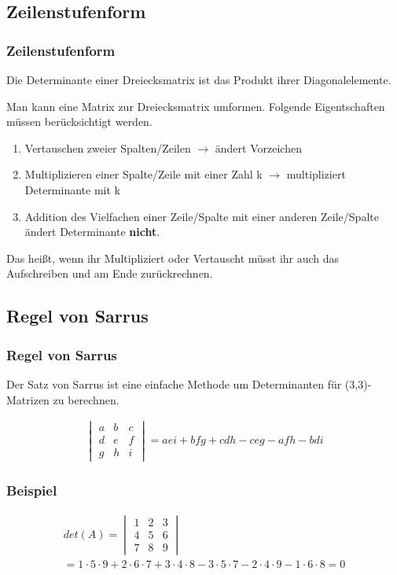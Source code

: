 \subsection{Zeilenstufenform}
\begin{frame}
	\frametitle{Zeilenstufenform}
	Die Determinante einer Dreiecksmatrix ist das Produkt ihrer Diagonalelemente.

	Man kann eine Matrix zur Dreiecksmatrix umformen. 
	Folgende Eigentschaften müssen berücksichtigt werden.
	\begin{enumerate}
	\item Vertauschen zweier Spalten/Zeilen $\rightarrow$ ändert Vorzeichen
	\item Multiplizieren einer Spalte/Zeile mit einer Zahl k $\rightarrow$ multipliziert Determinante mit k
	\item Addition des Vielfachen einer Zeile/Spalte mit einer anderen Zeile/Spalte ändert Determinante \textbf{nicht}.
	\end{enumerate}
	Das heißt, wenn ihr Multipliziert oder Vertauscht müsst ihr auch das Aufschreiben und am Ende zurückrechnen.
\end{frame}


\subsection{Regel von Sarrus}

\begin{frame}
	\frametitle{Regel von Sarrus}
	Der Satz von Sarrus ist eine einfache Methode um Determinanten für (3,3)-Matrizen zu berechnen.

	\begin{gather*}
	\begin{vmatrix}
	a & b & c \\
	d & e & f \\
	g & h & i
	\end{vmatrix} = aei + bfg + cdh - ceg - afh - bdi 
	\end{gather*}
\end{frame}



\begin{frame}
	\frametitle{Beispiel}
	\begin{gather*}
		det(A) = \begin{vmatrix}
			1 & 2 & 3 \\
			4 & 5 & 6 \\
			7 & 8 & 9
		\end{vmatrix} \\
		= 1 \cdot 5 \cdot 9 + 2 \cdot 6 \cdot 7 + 3 \cdot 4 \cdot 8 - 3 \cdot 5 \cdot 7 - 2 \cdot 4 \cdot 9 - 1 \cdot 6 \cdot 8 = 0
	\end{gather*}
\end{frame}

